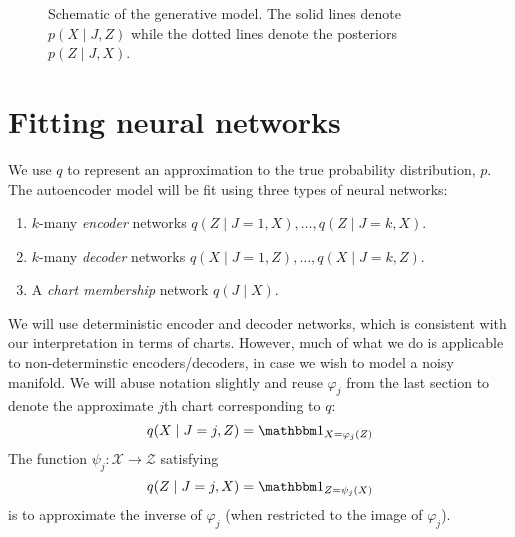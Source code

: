 \documentclass[reqno,11pt]{article}
\renewcommand{\phi}{\varphi}
\newcommand{\X}{\mathcal{X}}
\newcommand{\Z}{\mathcal{Z}}
\begin{document}
\begin{figure}
\centering
{}
\captionsetup{width=.75\linewidth}
\caption{Schematic of the generative model. The solid lines denote $p(X \mid J, Z)$ while the dotted lines denote the posteriors $p(Z \mid J, X)$.}
\label{schematic}
\end{figure}

\section{Fitting neural networks}\label{sec-fitting-neural-networks}
We use $q$ to represent an approximation to the true probability distribution, $p$. The autoencoder model will be fit using three types of neural networks:
\begin{enumerate}
\item $k$-many \textit{encoder} networks $q(Z \mid J=1, X), \ldots, q(Z\mid J=k, X)$.
\item $k$-many \textit{decoder} networks $q(X \mid J=1, Z), \ldots, q(X\mid J=k, Z)$.
\item A \textit{chart membership} network $q(J \mid X)$.
\end{enumerate}
We will use deterministic encoder and decoder networks, which is consistent with our interpretation in terms of charts. However, much of what we do is applicable to non-determinstic encoders/decoders, in case we wish to model a noisy manifold. We will abuse notation slightly and reuse $\phi_j$ from the last section to denote the approximate $j$th chart corresponding to $q$: 
\[
q(X\mid J=j, Z) = \mathbbm 1_{X = \phi_j(Z)}
\]
The function $\psi_j : \X \to \Z$ satisfying
\[
q(Z\mid J=j, X) = \mathbbm 1_{Z = \psi_j(X)}
\]
is to approximate the inverse of $\phi_j$ (when restricted to the image of $\phi_j$).
\end{document}
